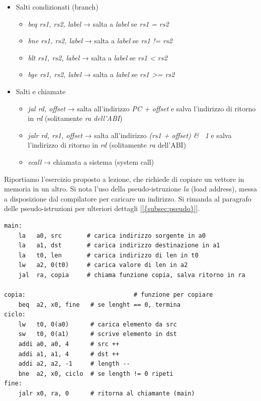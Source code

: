 \begin{itemize}
	\item Salti condizionati (branch)
	\begin{itemize}
		\item \textit{beq rs1, rs2, label} → salta a \textit{label} se \textit{rs1 = rs2}
		\item \textit{bne rs1, rs2, label} → salta a \textit{label} se \textit{rs1 != rs2}
		\item \textit{blt rs1, rs2, label} → salta a \textit{label} se \textit{rs1 < rs2} 
		\item \textit{bge rs1, rs2, label} → salta a \textit{label} se \textit{rs1 >= rs2}
	\end{itemize}
	\item Salti e chiamate
	\begin{itemize}
		\item \textit{jal rd, offset} → salta all'indirizzo \textit{PC + offset} e salva l'indirizzo di ritorno in \textit{rd} (solitamente \textit{ra dell'ABI})
		\item \textit{jalr rd, rs1, offset} → salta all'indirizzo \textit{(rs1 + offset) \& ~1} e salva l'indirizzo di ritorno in \textit{rd} (solitamente \textit{ra} dell'ABI)
		\item \textit{ecall} → chiamata a sistema (system call)
	\end{itemize}
\end{itemize}
Riportiamo l'esercizio proposto a lezione, che richiede di copiare un vettore in memoria in un altro. Si nota l'uso della pseudo-istruzione \textit{la} (load address), messa a disposizione dal compilatore per caricare un indirizzo. Si rimanda al paragrafo delle pseudo-istruzioni per ulteriori dettagli [\ref{{subsec:pseudo}}].
\begin{lstlisting}
main:
    la   a0, src       # carica indirizzo sorgente in a0
	la   a1, dst       # carica indirizzo destinazione in a1
    la   t0, len       # carica indirizzo di len in t0
	lw   a2, 0(t0)     # carica valore di len in a2
	jal  ra, copia     # chiama funzione copia, salva ritorno in ra	
	
copia:								# funzione per copiare
	beq  a2, x0, fine   # se lenght == 0, termina
ciclo:
	lw   t0, 0(a0)      # carica elemento da src
	sw   t0, 0(a1)      # scrive elemento in dst
	addi a0, a0, 4      # src ++
	addi a1, a1, 4      # dst ++
	addi a2, a2, -1     # length --
	bne  a2, x0, ciclo  # se length != 0 ripeti	
fine:
	jalr x0, ra, 0      # ritorna al chiamante (main)
\end{lstlisting}

